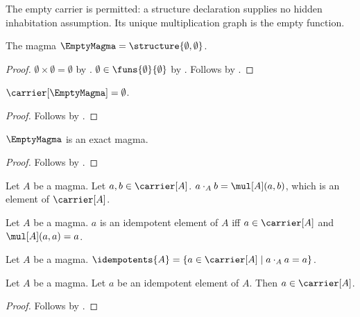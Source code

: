 The empty carrier is permitted: a structure declaration supplies no hidden
inhabitation assumption.  Its unique multiplication graph is the empty
function.

\begin{instance}\label{empty_magma}
    The magma $\EmptyMagma=\structure{\emptyset,\emptyset}$.
\end{instance}
\begin{proof}
    $\emptyset\times\emptyset=\emptyset$
        by .
    $\emptyset\in\funs{\emptyset}{\emptyset}$ by
        .
    Follows by .
\end{proof}

\begin{proposition}\label{empty_magma_carrier}
    $\carrier[\EmptyMagma]=\emptyset$.
\end{proposition}
\begin{proof}
    Follows by .
\end{proof}

\begin{proposition}\label{empty_magma_is_exact}
    $\EmptyMagma$ is an exact magma.
\end{proposition}
\begin{proof}
    Follows by .
\end{proof}

\begin{definition}\label{cdot_indexed}
    Let $A$ be a magma.
    Let $a,b\in\carrier[A]$.
    $a\cdot_{A} b = \mul[A](a,b)$,
        which is an element of $\carrier[A]$.
\end{definition}

\begin{definition}\label{idempotentelement}
    Let $A$ be a magma.
    $a$ is an idempotent element of $A$ iff
        $a\in\carrier[A]$ and $\mul[A](a,a)=a$.
\end{definition}


\begin{definition}\label{idempotents}
    Let $A$ be a magma.
    $\idempotents{A}=\{a\in\carrier[A]\mid a\cdot_{A}a=a\}$.
\end{definition}

\begin{classification}\label{idempotent_element_in_carrier}
    Let $A$ be a magma.
    Let $a$ be an idempotent element of $A$.
    Then $a\in\carrier[A]$.
\end{classification}
\begin{proof}
    Follows by .
\end{proof}


